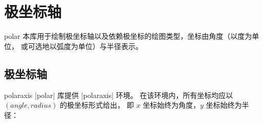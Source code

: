 
\section{极坐标轴}
\label{sec:polar}

{
\def\pgfplotsmanualcurlibrary{polar}

\begin{pgfplotslibrary}{polar}
    本库用于绘制极坐标轴以及依赖极坐标的绘图类型，坐标由角度（以度为单位，
    或可选地以弧度为单位）与半径表示。
\end{pgfplotslibrary}


\subsection{极坐标轴}

\begin{environment}{{polaraxis}}
    |polar| 库提供 |polaraxis| 环境。
    在该环境内，所有坐标均应以 $(\mathit{angle},\mathit{radius})$ 的极坐标形式给出，
    即 $x$ 坐标始终为角度，$y$ 坐标始终为半径：
\end{environment}

\begin{codeexample}[]
\end{codeexample}

\begin{codeexample}[]
\end{codeexample}

\begin{codeexample}[]
\end{codeexample}

}
